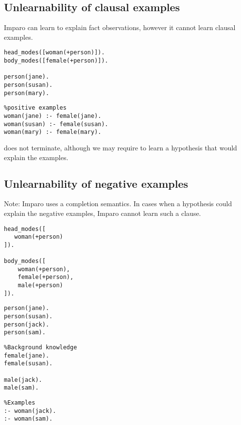 \subsection{Unlearnability of clausal examples}\label{imparo_clausal_examples}
Imparo can learn to explain fact observations, however it cannot learn clausal examples.

\begin{minipage}[t]{.60\textwidth}
\begin{lstlisting}
head_modes([woman(+person)]).
body_modes([female(+person)]).

person(jane).
person(susan).
person(mary).
\end{lstlisting}
\end{minipage}
\begin{minipage}[t]{.20\textwidth}
\begin{lstlisting}
%positive examples
woman(jane) :- female(jane).
woman(susan) :- female(susan).
woman(mary) :- female(mary).
\end{lstlisting}
\end{minipage}

does not terminate, although we may require to learn a hypothesis
 that would explain the examples.

\subsection{Unlearnability of negative examples}
Note: Imparo uses a completion semantics.
In cases when a hypothesis could explain the negative examples, Imparo cannot learn such a clause.

\begin{minipage}[t]{.25\textwidth}
\begin{lstlisting}
head_modes([
   woman(+person)
]).

body_modes([
    woman(+person),
    female(+person),
    male(+person)
]).
\end{lstlisting}
\end{minipage}
\begin{minipage}[t]{.20\textwidth}
\begin{lstlisting}
person(jane).
person(susan).
person(jack).
person(sam).
\end{lstlisting}
\end{minipage}
\begin{minipage}[t]{.30\textwidth}
\begin{lstlisting}
%Background knowledge
female(jane).
female(susan).

male(jack).
male(sam).
\end{lstlisting}
\end{minipage}
\begin{minipage}[t]{.25\textwidth}
\begin{lstlisting}
%Examples
:- woman(jack).
:- woman(sam).
\end{lstlisting}
\end{minipage}

